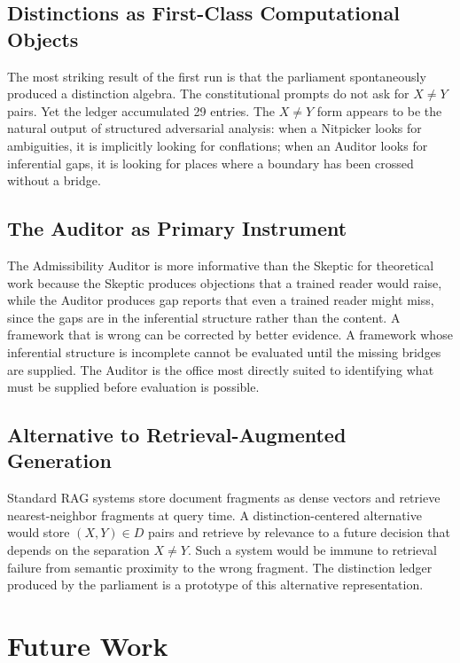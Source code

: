 \documentclass[12pt, a4paper]{article}
\theoremstyle{principle}
\theoremstyle{definition}
\begin{document}
\subsection{Distinctions as First-Class Computational Objects}

The most striking result of the first run is that the parliament spontaneously
produced a distinction algebra. The constitutional prompts do not ask for
$X \neq Y$ pairs. Yet the ledger accumulated 29 entries. The $X \neq Y$ form
appears to be the natural output of structured adversarial analysis: when a
Nitpicker looks for ambiguities, it is implicitly looking for conflations; when
an Auditor looks for inferential gaps, it is looking for places where a boundary
has been crossed without a bridge.

\subsection{The Auditor as Primary Instrument}

The Admissibility Auditor is more informative than the Skeptic for theoretical
work because the Skeptic produces objections that a trained reader would raise, while
the Auditor produces gap reports that even a trained reader might miss, since the
gaps are in the inferential structure rather than the content. A framework that is
wrong can be corrected by better evidence. A framework whose inferential structure
is incomplete cannot be evaluated until the missing bridges are supplied. The Auditor
is the office most directly suited to identifying what must be supplied before
evaluation is possible.

\subsection{Alternative to Retrieval-Augmented Generation}

Standard RAG systems store document fragments as dense vectors and retrieve
nearest-neighbor fragments at query time. A distinction-centered alternative would
store $(X, Y) \in D$ pairs and retrieve by relevance to a future decision that
depends on the separation $X \neq Y$. Such a system would be immune to retrieval
failure from semantic proximity to the wrong fragment. The distinction ledger
produced by the parliament is a prototype of this alternative representation.

\section{Future Work}
\label{sec:future}
\end{document}
